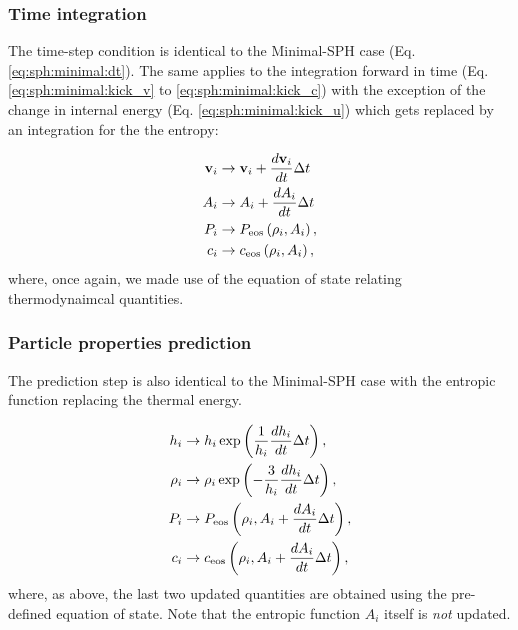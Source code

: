 \documentclass[fleqn, usenatbib, useAMS, a4paper]{mnras}
\renewcommand{\vec}[1]{{\mathbf{#1}}}
\begin{document}
\subsubsection{Time integration}

The time-step condition is identical to the Minimal-SPH case
(Eq. \ref{eq:sph:minimal:dt}). The same applies to the integration
forward in time (Eq. \ref{eq:sph:minimal:kick_v} to
\ref{eq:sph:minimal:kick_c}) with the exception of the change in
internal energy (Eq. \ref{eq:sph:minimal:kick_u}) which gets replaced
by an integration for the the entropy:


\begin{align}
  \vec{v}_i &\rightarrow \vec{v}_i + \frac{d\vec{v}_i}{dt} \Delta t  \label{eq:sph:gadget2:kick_v}\\
  A_i &\rightarrow A_i + \frac{dA_i}{dt} \Delta t \label{eq:sph:gadget2:kick_A}\\
  P_i &\rightarrow P_{\rm eos}\left(\rho_i, A_i\right) \label{eq:sph:gadget2:kick_P}, \\
  c_i &\rightarrow c_{\rm eos}\left(\rho_i, A_i\right) \label{eq:sph:gadget2:kick_c},
\end{align}
where, once again, we made use of the equation of state relating
thermodynaimcal quantities.

\subsubsection{Particle properties prediction}

The prediction step is also identical to the Minimal-SPH case with the
entropic function replacing the thermal energy.

\begin{align}
  h_i &\rightarrow h_i \exp\left(\frac{1}{h_i} \frac{dh_i}{dt}
  \Delta t\right), \label{eq:sph:gadget2:drift_h}\\
  \rho_i &\rightarrow \rho_i \exp\left(-\frac{3}{h_i} \frac{dh_i}{dt}
  \Delta t\right), \label{eq:sph:gadget2:drift_rho} \\
  P_i &\rightarrow P_{\rm eos}\left(\rho_i, A_i + \frac{dA_i}{dt} \Delta t\right), \label{eq:sph:gadget2:drift_P}\\
  c_i &\rightarrow c_{\rm eos}\left(\rho_i, A_i + \frac{dA_i}{dt}
  \Delta t\right) \label{eq:sph:gadget2:drift_c},
\end{align}
where, as above, the last two updated quantities are obtained using
the pre-defined equation of state. Note that the entropic function $A_i$
itself is \emph{not} updated.
\end{document}

